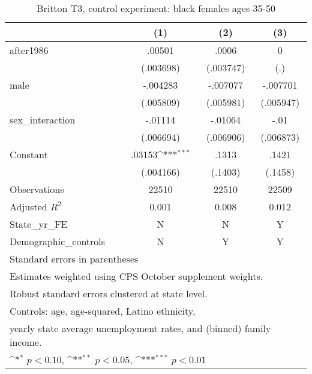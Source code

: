 \begin{table}[htbp]\centering
\def\sym#1{\ifmmode^{#1}\else\(^{#1}\)\fi}
\caption{Britton T3, control experiment: black females ages 35-50}
\begin{tabular}{l*{3}{c}}
\hline\hline
                    &\multicolumn{1}{c}{(1)}         &\multicolumn{1}{c}{(2)}         &\multicolumn{1}{c}{(3)}         \\
\hline
after1986           &      .00501         &       .0006         &           0         \\
                    &   (.003698)         &   (.003747)         &         (.)         \\
[1em]
male                &    -.004283         &    -.007077         &    -.007701         \\
                    &   (.005809)         &   (.005981)         &   (.005947)         \\
[1em]
sex\_interaction     &     -.01114         &     -.01064         &        -.01         \\
                    &   (.006694)         &   (.006906)         &   (.006873)         \\
[1em]
Constant            &      .03153\sym{***}&       .1313         &       .1421         \\
                    &   (.004166)         &     (.1403)         &     (.1458)         \\
\hline
Observations        &       22510         &       22510         &       22509         \\
Adjusted \(R^{2}\)  &       0.001         &       0.008         &       0.012         \\
State\_yr\_FE         &           N         &           N         &           Y         \\
Demographic\_controls&           N         &           Y         &           Y         \\
\hline\hline
\multicolumn{4}{l}{\footnotesize Standard errors in parentheses}\\
\multicolumn{4}{l}{\footnotesize Estimates weighted using CPS October supplement weights.}\\
\multicolumn{4}{l}{\footnotesize Robust standard errors clustered at state level.}\\
\multicolumn{4}{l}{\footnotesize Controls: age, age-squared, Latino ethnicity,}\\
\multicolumn{4}{l}{\footnotesize yearly state average unemployment rates, and (binned) family income.}\\
\multicolumn{4}{l}{\footnotesize \sym{*} \(p<0.10\), \sym{**} \(p<0.05\), \sym{***} \(p<0.01\)}\\
\end{tabular}
\end{table}
